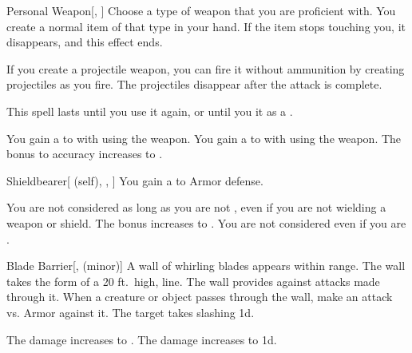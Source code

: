 \lowercase{\hypertarget{spell:Personal Weapon}{}}\label{spell:Personal Weapon}
\begin{freeability}[Rank 1]{\hypertarget{spell:Personal Weapon}{Personal Weapon}}[, ]
Choose a type of weapon that you are proficient with.
You create a normal item of that type in your hand.
If the item stops touching you, it disappears, and this effect ends.

If you create a projectile weapon, you can fire it without ammunition by creating projectiles as you fire.
The projectiles disappear after the attack is complete.

This spell lasts until you use it again, or until you  it as a .

\rankline
{} You gain a   to  with  using the weapon.
 You gain a   to  with  using the weapon.
 The bonus to accuracy increases to .
\end{freeability}
\vspace{0.25em}



\lowercase{\hypertarget{spell:Shieldbearer}{}}\label{spell:Shieldbearer}
\begin{attuneability}[Rank 1]{\hypertarget{spell:Shieldbearer}{Shieldbearer}}[ (self), , ]
You gain a   to Armor defense.

\rankline
{} You are not considered  as long as you are not , even if you are not wielding a weapon or shield.
 The bonus increases to .
 You are not considered  even if you are .
\end{attuneability}
\vspace{0.25em}



\lowercase{\hypertarget{spell:Blade Barrier}{}}\label{spell:Blade Barrier}
\begin{freeability}[Rank 3]{\hypertarget{spell:Blade Barrier}{Blade Barrier}}[,  (minor)]
A wall of whirling blades appears within \rngmed range.
The wall takes the form of a 20 ft.\ high, \arealarge line.
The wall provides  against attacks made through it.
When a creature or object passes through the wall, make an attack vs. Armor against it.
\hit The target takes slashing  \minus1d.

\rankline
{} The damage increases to .
 The damage increases to  \plus1d.
\end{freeability}
\vspace{0.25em}



